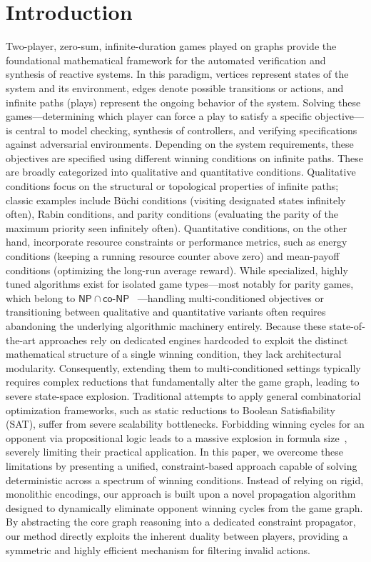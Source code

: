 \documentclass[preprint,12pt,authoryear]{elsarticle}
\begin{document}
\section{Introduction}
Two-player, zero-sum, infinite-duration games played on graphs provide the foundational mathematical framework for the automated verification and synthesis of reactive systems. In this paradigm, vertices represent states of the system and its environment, edges denote possible transitions or actions, and infinite paths (plays) represent the ongoing behavior of the system. Solving these games—determining which player can force a play to satisfy a specific objective—is central to model checking, synthesis of controllers, and verifying specifications against adversarial environments.
%
Depending on the system requirements, these objectives are specified using different winning conditions on infinite paths. These are broadly categorized into qualitative and quantitative conditions. Qualitative conditions focus on the structural or topological properties of infinite paths; classic examples include Büchi conditions (visiting designated states infinitely often), Rabin conditions, and parity conditions (evaluating the parity of the maximum priority seen infinitely often). Quantitative conditions, on the other hand, incorporate resource constraints or performance metrics, such as energy conditions (keeping a running resource counter above zero) and mean-payoff conditions (optimizing the long-run average reward).
%
While specialized, highly tuned algorithms exist for isolated game types—most notably for parity games, which belong to $\mathsf{NP} \cap \mathsf{co\textit{-}NP}$~\cite{Jurdziński:1998}  —handling multi-conditioned objectives or transitioning between qualitative and quantitative variants often requires abandoning the underlying algorithmic machinery entirely. Because these state-of-the-art approaches rely on dedicated engines hardcoded to exploit the distinct mathematical structure of a single winning condition, they lack architectural modularity. Consequently, extending them to multi-conditioned settings typically requires complex reductions that fundamentally alter the game graph, leading to severe state-space explosion.
%
Traditional attempts to apply general combinatorial optimization frameworks, such as static reductions to Boolean Satisfiability (SAT), suffer from severe scalability bottlenecks. Forbidding winning cycles for an opponent via propositional logic leads to a massive explosion in formula size~\cite{Heljanko:2012}, severely limiting their practical application. In this paper, we overcome these limitations by presenting a unified, constraint-based approach capable of solving deterministic \wregulargames across a spectrum of winning conditions. Instead of relying on rigid, monolithic encodings, our approach is built upon a novel propagation algorithm designed to dynamically eliminate opponent winning cycles from the game graph. By abstracting the core graph reasoning into a dedicated constraint propagator, our method directly exploits the inherent duality between players, providing a symmetric and highly efficient mechanism for filtering invalid actions.
\end{document}
